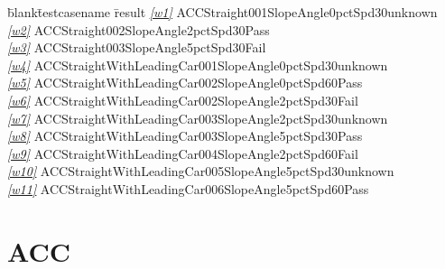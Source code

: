 \documentclass[12pt]{report}
\begin{document}
\begin{CJK}{GBK}{kai} 
\begin{tabbing} 
\hspace*{30bp}\=blank\hspace*{30bp}\=testcasename\hspace*{250bp} \=result\kill 
\>\textit{\underline{\ref{w1}}} \>ACCStraight001SlopeAngle0pctSpd30\>\textcolor[rgb]{1,1,0}{unknown}\\ 
\>\textit{\underline{\ref{w2}}} \>ACCStraight002SlopeAngle2pctSpd30\>Pass\\ 
\>\textit{\underline{\ref{w3}}} \>ACCStraight003SlopeAngle5pctSpd30\>\textcolor[rgb]{1,0,0}{Fail}\\ 
\>\textit{\underline{\ref{w4}}} \>ACCStraightWithLeadingCar001SlopeAngle0pctSpd30\>\textcolor[rgb]{1,1,0}{unknown}\\ 
\>\textit{\underline{\ref{w5}}} \>ACCStraightWithLeadingCar002SlopeAngle0pctSpd60\>Pass\\ 
\>\textit{\underline{\ref{w6}}} \>ACCStraightWithLeadingCar002SlopeAngle2pctSpd30\>\textcolor[rgb]{1,0,0}{Fail}\\ 
\>\textit{\underline{\ref{w7}}} \>ACCStraightWithLeadingCar003SlopeAngle2pctSpd30\>\textcolor[rgb]{1,1,0}{unknown}\\ 
\>\textit{\underline{\ref{w8}}} \>ACCStraightWithLeadingCar003SlopeAngle5pctSpd30\>Pass\\ 
\>\textit{\underline{\ref{w9}}} \>ACCStraightWithLeadingCar004SlopeAngle2pctSpd60\>\textcolor[rgb]{1,0,0}{Fail}\\ 
\>\textit{\underline{\ref{w10}}} \>ACCStraightWithLeadingCar005SlopeAngle5pctSpd30\>\textcolor[rgb]{1,1,0}{unknown}\\ 
\>\textit{\underline{\ref{w11}}} \>ACCStraightWithLeadingCar006SlopeAngle5pctSpd60\>Pass\\ 
\end{tabbing} 
\end{CJK} 
\chapter{ACC} 
\newpage 
\end{document}
